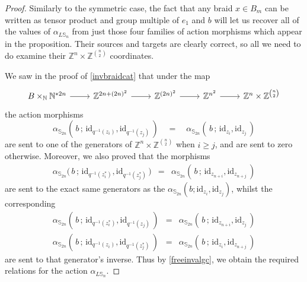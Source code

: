 \documentclass{amsbook} %
\newcommand{\id}{\textrm{id}}
\numberwithin{section}{chapter}
\begin{document}
\begin{proof}
Similarly to the symmetric case, the fact that any braid $x \in B_m$ can be written as tensor product and group multiple of $e_1$ and $b$ will let us recover all of the values of $\alpha_{L\mathbb{S}_n}$ from just those four families of action morphisms which appear in the proposition. Their sources and targets are clearly correct, so all we need to do examine their $\mathbb{Z}^{n} \times \mathbb{Z}^{{n}\choose{2}}$ coordinates.

We saw in the proof of \cref{invbraidcat} that under the map
\[ \begin{tikzcd}
B \times_{\mathbb{N}} \mathbb{N}^{\ast 2n} \ar[r] & \mathbb{Z}^{2n + (2n)^2} \ar[r] & \mathbb{Z}^{(2n)^2} \ar[r] & \mathbb{Z}^{n^2} \ar[r] & \mathbb{Z}^{n} \times \mathbb{Z}^{{n}\choose{2}} 
\end{tikzcd} \]
the action morphisms
\[ \alpha_{\mathbb{S}_{2n}}( \, b \, ; \, \id_{q^{-1}(z_i)}, \id_{q^{-1}(z_j)} \, ) \quad = \quad \alpha_{\mathbb{S}_{2n}}( \, b \, ; \, \id_{z_i}, \id_{z_j} \, ) \]
are sent to one of the generators of $\mathbb{Z}^{n} \times \mathbb{Z}^{{n}\choose{2}}$ when $i \ge j$, and are sent to zero otherwise. Moreover, we also proved that the morphisms
\[ \begin{array}{rll} 
			\alpha_{\mathbb{S}_{2n}}( \, b \, ; \, \id_{q^{-1}(z_i^*)}, \id_{q^{-1}(z_j^*)} \, \big) & = & \alpha_{\mathbb{S}_{2n}}( \, b \, ; \, \id_{z_{n+i}}, \id_{z_{n+j}} \, )
		\end{array}
\]
are sent to the exact same generators as the $\alpha_{\mathbb{S}_{2n}}(b;\id_{z_i}, \id_{z_j})$, whilst the corresponding
\[ \begin{array}{rll}
			\alpha_{\mathbb{S}_{2n}}( \, b\, ; \, \id_{q^{-1}(z_i^*)}, \id_{q^{-1}(z_j)} \, ) & = & \alpha_{\mathbb{S}_{2n}}( \, b \, ; \, \id_{z_{n+i}}, \id_{z_j} \, ) \\
			\alpha_{\mathbb{S}_{2n}}( \, b \, ; \, \id_{q^{-1}(z_i)}, \id_{q^{-1}(z_j^*)} \, ) & = & \alpha_{\mathbb{S}_{2n}}( \, b \, ; \, \id_{z_i}, \id_{z_{n+j}} \, ) 
		\end{array}
\]
are sent to that generator's inverse. Thus by \cref{freeinvalgc}, we obtain the required relations for the action $\alpha_{L\mathbb{S}_n}$.
\end{proof}
\end{document}
